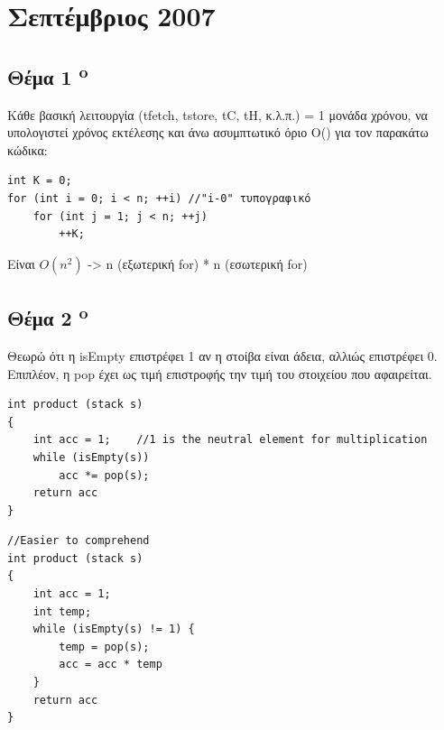 \documentclass[a4paper,10pt]{article}
\begin{document}
\renewcommand{\labelenumi}{\roman{enumi})}
\renewcommand{\labelenumii}{(\arabic{enumii})}



\section{Σεπτέμβριος 2007}
\setcounter{section}{1}

\subsection{Θέμα 1 \textsuperscript{o}}
Κάθε βασική λειτουργία (tfetch, tstore, tC, tH, κ.λ.π.) = 1 μονάδα χρόνου, να
υπολογιστεί χρόνος εκτέλεσης και άνω ασυμπτωτικό όριο Ο() για τον παρακάτω
κώδικα:

\begin{verbatim}
int K = 0;
for (int i = 0; i < n; ++i) //"i-0" τυπογραφικό
    for (int j = 1; j < n; ++j)
        ++K;
\end{verbatim}
Είναι $O(n^2)$ -> n (εξωτερική for) * n (εσωτερική for)

\subsection{Θέμα 2 \textsuperscript{o}}
Θεωρώ ότι η isEmpty επιστρέφει 1 αν η στοίβα είναι άδεια, αλλιώς επιστρέφει 0.
Επιπλέον, η pop έχει ως τιμή επιστροφής την τιμή του στοιχείου που αφαιρείται.

\begin{verbatim}
int product (stack s)
{
    int acc = 1;    //1 is the neutral element for multiplication
    while (isEmpty(s))
        acc *= pop(s);
    return acc
}
\end{verbatim}

\begin{verbatim}
//Easier to comprehend
int product (stack s)
{
    int acc = 1;
    int temp;
    while (isEmpty(s) != 1) {
        temp = pop(s);
        acc = acc * temp
    }
    return acc
}

\end{verbatim}
\end{document}
